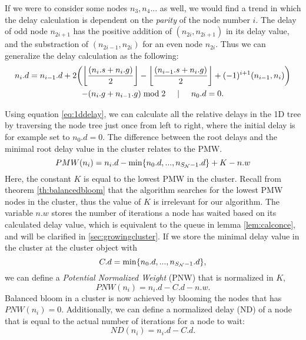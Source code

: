 If we were to consider some nodes $n_3, n_4...$ as well, we would find a trend in which the delay calculation is dependent on the \emph{parity} of the node number $i$. The delay of odd node $n_{2i+1}$ has the positive addition of $(n_{2i}, n_{2i+1})$ in its delay value, and the substraction of $(n_{2i-1}, n_{2i})$ for an even node $n_{2i}$. Thus we can generalize the delay calculation as the following:
\begin{multline}\label{eq:1ddelay}
n_i.d = n_{i-1}.d + 2\bigg({\left \lfloor \frac{(n_i.s+n_i.g)}{2} \right \rfloor } - {\left \lfloor \frac{(n_{i-1}.s+n_i.g)}{2} \right \rfloor } + (-1)^{i+1}(n_{i-1}, n_i)\bigg) \\
         - (n_{i}.g + n_{i-1}.g)\bmod 2 \hspace{.5cm} | \hspace{.5cm} n_0.d = 0.
\end{multline}

Using equation \eqref{eq:1ddelay}, we can calculate all the relative delays in the 1D tree by traversing the node tree just once from left to right, where the initial delay is for example set to $n_0.d=0$. The difference between the root delays and the minimal root delay value in the cluster relates to the PMW.
\begin{equation}\label{eq:pmw}
  PMW(n_i) = n_i.d - \min \{n_0.d,...,n_{S_{\mathcal{N}}-1}.d\} + K - n.w
\end{equation}
Here, the constant $K$ is equal to the lowest PMW in the cluster. Recall from theorem \ref{th:balancedbloom} that the algorithm searches for the lowest PMW nodes in the cluster, thus the value of $K$ is irrelevant for our algorithm. The variable $n.w$ stores the number of iterations a node has waited based on its calculated delay value, which is equivalent to the queue in lemma \ref{lem:calconce}, and will be clarified in \ref{sec:growingcluster}. If we store the minimal delay value in the cluster at the cluster object with
\begin{equation}\label{eq:cd}
  C.d = \min \{n_0.d,...,n_{S_{\mathcal{N}}-1}.d\},
\end{equation}
we can define a \emph{Potential Normalized Weight} (PNW) that is normalized in $K$,
\begin{equation}\label{eq:pnw}
  PNW(n_i) = n_i.d - C.d - n.w.
\end{equation}
Balanced bloom in a cluster is now achieved by blooming the nodes that has $PNW(n_i) = 0$. Additionally, we can define a normalized delay (ND) of a node that is equal to the actual number of iterations for a node to wait:
\begin{equation}\label{eq:ad}
  ND(n_i) = n_i.d - C.d.
\end{equation}

